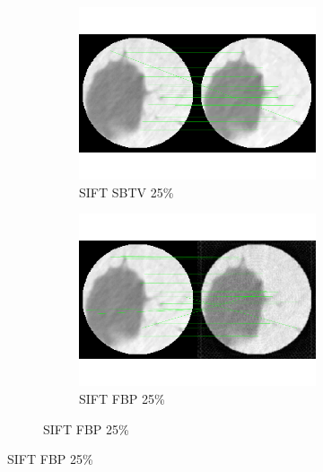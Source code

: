 \documentclass[10pt,a4paper,titlepage]{article}
\begin{document}
\begin{figure}
\begin{figure}[H]
			\begin{subfigure}[b]{0.475\textwidth}
				\includegraphics[width=\textwidth]{Sample1/SIFT/SB/25p.png}
				\caption{SIFT SBTV 25\%}
			\end{subfigure}
			\begin{subfigure}[b]{0.475\textwidth}
				\includegraphics[width=\textwidth]{Sample1/SIFT/FBP/25p.png}
				\caption{SIFT FBP 25\%}
			\end{subfigure}
			

\end{figure}
\end{figure}
\end{document}
